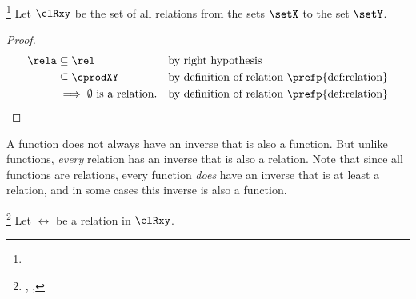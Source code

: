 \begin{proposition}
\footnote{
  }
\label{prop:rel_subset}
Let $\clRxy$ be the set of all relations from the sets $\setX$ to the set $\setY$.
\end{proposition}
\begin{proof}
\begin{align*}
  \rela
    &\subseteq \rel
    &&         \text{by right hypothesis}
  \\&\subseteq \cprodXY
    && \text{by definition of relation \prefp{def:relation}}
  \\&\implies \text{$\emptyset$ is a relation.}
    && \text{by definition of relation \prefp{def:relation}}
\end{align*}
\end{proof}

A function does not always have an inverse that is also a function.
But unlike functions, \emph{every} relation has an inverse that is also a relation.
Note that since all functions are relations,
every function \emph{does} have an inverse that is at least a relation,
and in some cases this inverse is also a function.
\begin{definition}
\label{def:rel_inverse}
\footnote{
  ,
  ,
  }
Let $\rel$ be a relation in $\clRxy$.
\end{definition}


